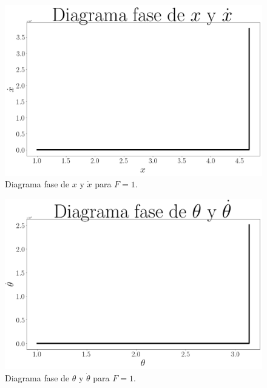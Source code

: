 \documentclass[12pt,letterpaper]{article}
\begin{document}
\begin{figure}[h]
 \centering
 \includegraphics[scale=0.2]{img/sp_phase_x_dx_f1.png}
 \caption{Diagrama fase de $x$ y $\dot{x}$ para $F=1$.}
 \label{fig: sp phase x dx force 1}
\end{figure}

\begin{figure}[h]
 \centering
 \includegraphics[scale=0.2]{img/sp_phase_theta_dtheta_f1.png}
\caption{Diagrama fase de $\theta$ y $\dot{\theta}$ para $F=1$.}
 \label{fig: sp phase theta dtheta force 1}
\end{figure}
\end{document}
